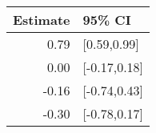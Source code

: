 \begin{tabular}{rl}
  \hline
Estimate & 95\% CI \\ 
  \hline
0.79 & [0.59,0.99] \\ 
  0.00 & [-0.17,0.18] \\ 
  -0.16 & [-0.74,0.43] \\ 
  -0.30 & [-0.78,0.17] \\ 
   \hline
\end{tabular}

